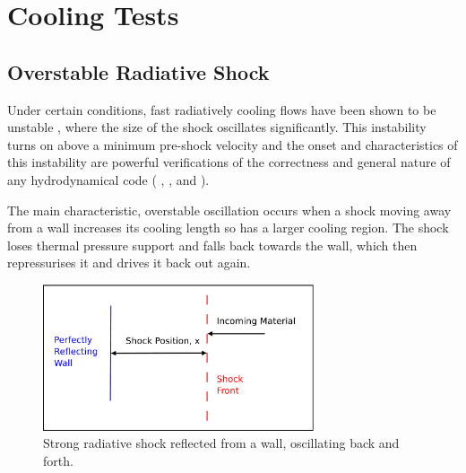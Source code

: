 \section{Cooling Tests}
\subsection{Overstable Radiative Shock}


Under certain conditions, fast radiatively cooling flows have been shown to be unstable \citep{1982ApJ...261..543C}, where the size of the shock oscillates significantly.
This instability turns on above a minimum pre-shock velocity and the onset and characteristics of this instability are powerful verifications of the correctness and general nature of any hydrodynamical code (
\citet{1984ApJ...276..667I},
\citet{1988ApJ...329..927G},
and \citet{1987MNRAS.224..179I}).

The main characteristic, overstable oscillation occurs when a shock moving away from a wall increases its cooling length so has a larger cooling region. 
The shock loses thermal pressure support and falls back towards the wall, which then repressurises it and drives it back out again.



\begin{figure}[t]
\centering
\includegraphics[width=8cm]{OverStableShockSchematic}
\caption{
Strong radiative shock reflected from a wall, oscillating back and forth.
}
\label{fig:OverStableShockSchematic} %
\end{figure}

